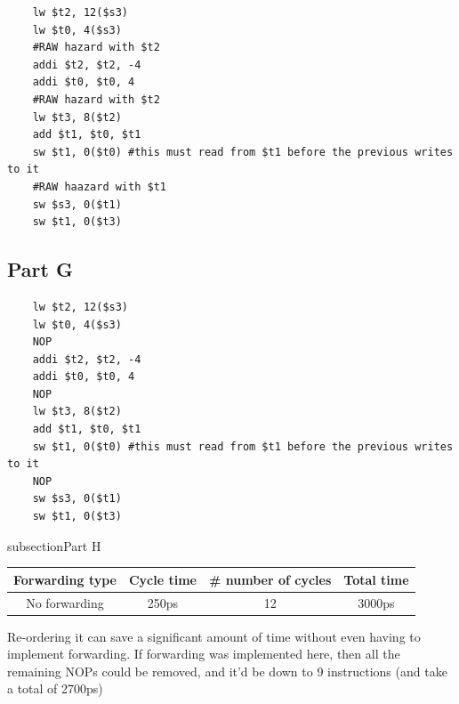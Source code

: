 \documentclass[11pt]{article} %
\begin{document}
\begin{verbatim}
    lw $t2, 12($s3)
    lw $t0, 4($s3)
    #RAW hazard with $t2
    addi $t2, $t2, -4
    addi $t0, $t0, 4
    #RAW hazard with $t2
    lw $t3, 8($t2)
    add $t1, $t0, $t1
    sw $t1, 0($t0) #this must read from $t1 before the previous writes to it
    #RAW haazard with $t1
    sw $s3, 0($t1)
    sw $t1, 0($t3)
\end{verbatim}

\subsection{Part G}

\begin{verbatim}
    lw $t2, 12($s3)
    lw $t0, 4($s3)
    NOP
    addi $t2, $t2, -4
    addi $t0, $t0, 4
    NOP
    lw $t3, 8($t2)
    add $t1, $t0, $t1
    sw $t1, 0($t0) #this must read from $t1 before the previous writes to it
    NOP
    sw $s3, 0($t1)
    sw $t1, 0($t3)
\end{verbatim}

subsection{Part H}

\begin{tabular}{c|c|c|c}
Forwarding type & Cycle time & \# number of cycles & Total time\\\hline
No forwarding & 250ps & 12 & 3000ps
\end{tabular}

Re-ordering it can save a significant amount of time without even having to implement forwarding. If forwarding was implemented here, then all the remaining NOPs could be removed, and it'd be down to 9 instructions (and take a total of 2700ps)
\end{document}
